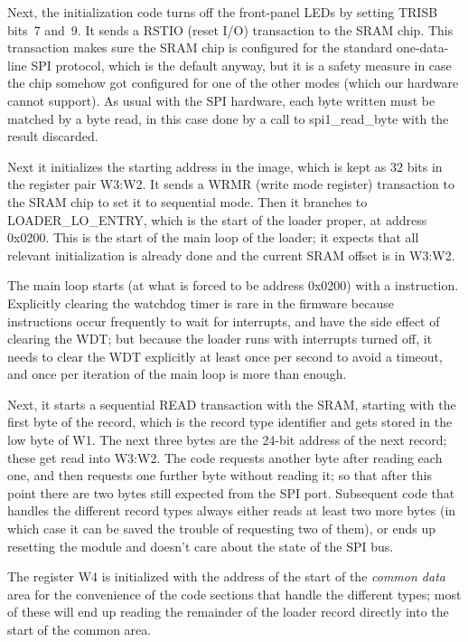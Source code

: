 Next, the initialization code turns off the front-panel LEDs by setting
TRISB bits~7 and~9.  It sends a RSTIO (reset I/O) transaction to the SRAM
chip.  This transaction makes sure the SRAM chip is configured for the
standard one-data-line SPI protocol, which is the default anyway, but it is
a safety measure in case the chip somehow got configured for one of the
other modes (which our hardware cannot support).  As usual with the SPI
hardware, each byte written must be matched by a byte read, in this case
done by a call to spi1\_read\_byte with the result discarded.

Next it initializes the starting address in the image, which is kept as 32
bits in the register pair W3:W2.  It sends a WRMR (write mode register)
transaction to the SRAM chip to set it to sequential mode.  Then it branches
to LOADER\_LO\_ENTRY, which is the start of the loader proper, at address
0x0200.  This is the start of the main loop of the loader; it expects that
all relevant initialization is already done and the current SRAM offset is
in W3:W2.

The main loop starts (at what is forced to be address 0x0200) with a
 instruction.  Explicitly clearing the watchdog timer is rare
in the firmware because  instructions occur frequently to wait
for interrupts, and have the side effect of clearing the WDT; but because
the loader runs with interrupts turned off, it needs to clear the WDT
explicitly at least once per second to avoid a timeout, and once per
iteration of the main loop is more than enough.

Next, it starts a sequential READ transaction with the SRAM, starting with
the first byte of the record, which is the record type identifier and gets
stored in the low byte of W1.  The next three bytes are the 24-bit address
of the next record; these get read into W3:W2.  The code requests another
byte after reading each one, and then requests one further byte without
reading it; so that after this point there are two bytes still expected from
the SPI port.  Subsequent code that handles the different record types
always either reads at least two more bytes (in which case it can be saved
the trouble of requesting two of them), or ends up resetting the module and
doesn't care about the state of the SPI bus.

The register W4 is initialized with the address of the start of the
\emph{common data} area for the convenience of the code sections that handle
the different types; most of these will end up reading the remainder of the
loader record directly into the start of the common area.

